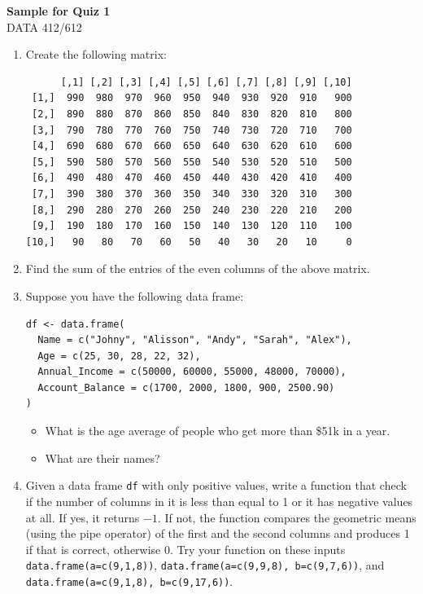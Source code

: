 \documentclass[11pt]{article}
\begin{document}
\begin{center}
{\LARGE\bfseries Sample for Quiz 1}\\[0.35em]
DATA 412/612
\end{center}

\vspace{0.5em}

\begin{enumerate}
\item Create the following matrix:
\begin{lstlisting}
      [,1] [,2] [,3] [,4] [,5] [,6] [,7] [,8] [,9] [,10]
 [1,]  990  980  970  960  950  940  930  920  910   900
 [2,]  890  880  870  860  850  840  830  820  810   800
 [3,]  790  780  770  760  750  740  730  720  710   700
 [4,]  690  680  670  660  650  640  630  620  610   600
 [5,]  590  580  570  560  550  540  530  520  510   500
 [6,]  490  480  470  460  450  440  430  420  410   400
 [7,]  390  380  370  360  350  340  330  320  310   300
 [8,]  290  280  270  260  250  240  230  220  210   200
 [9,]  190  180  170  160  150  140  130  120  110   100
[10,]   90   80   70   60   50   40   30   20   10     0
\end{lstlisting}

\item Find the sum of the entries of the even columns of the above matrix.

\item Suppose you have the following data frame:
\begin{lstlisting}
df <- data.frame(
  Name = c("Johny", "Alisson", "Andy", "Sarah", "Alex"),
  Age = c(25, 30, 28, 22, 32),
  Annual_Income = c(50000, 60000, 55000, 48000, 70000),
  Account_Balance = c(1700, 2000, 1800, 900, 2500.90)
)
\end{lstlisting}
\begin{itemize}
\item What is the age average of people who get more than \$51k in a year.
\item What are their names?
\end{itemize}

\item Given a data frame \texttt{df} with only positive values, write a function that check if the number of columns in it is less than equal to 1 or it has negative values at all. If yes, it returns $-1$. If not, the function compares the geometric means (using the pipe operator) of the first and the second columns and produces 1 if that is correct, otherwise 0. Try your function on these inputs \texttt{data.frame(a=c(9,1,8))}, \texttt{data.frame(a=c(9,9,8), b=c(9,7,6))}, and \texttt{data.frame(a=c(9,1,8), b=c(9,17,6))}.
\end{enumerate}
\end{document}
